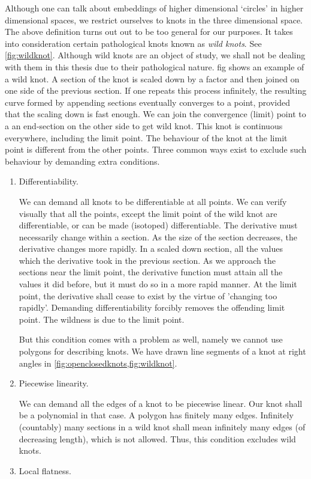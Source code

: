 Although one can talk about embeddings of higher dimensional `circles' in higher dimensional spaces, we restrict ourselves to knots in the three dimensional space. The above definition turns out out to be too general for our purposes. It takes into consideration certain pathological knots known as \textit{wild knots}. See \cref{fig:wildknot}. Although wild knots are an object of study, we shall not be dealing with them in this thesis due to their pathological nature. fig shows an example of a wild knot. A section of the knot is scaled down by a factor and then joined on one side of the previous section. If one repeats this process infinitely, the resulting curve formed by appending sections eventually converges to a point, provided that the scaling down is fast enough. We can join the convergence (limit) point to a an end-section on the other side to get wild knot. This knot is continuous everywhere, including the limit point. The behaviour of the knot at the limit point is different from the other points. Three common ways exist to exclude such behaviour by demanding extra conditions.
\begin{enumerate}
    \item Differentiability.

    We can demand all knots to be differentiable at all points. We can verify visually that all the points, except the limit point of the wild knot are differentiable, or can be made (isotoped) differentiable. The derivative must necessarily change within a section. As the size of the section decreases, the derivative changes more rapidly. In a scaled down section, all the values which the derivative took in the previous section. As we approach the sections near the limit point, the derivative function must attain all the values it did before, but it must do so in a more rapid manner. At the limit point, the derivative shall cease to exist by the virtue of 'changing too rapidly'. Demanding differentiability forcibly removes the offending limit point. The wildness is due to the limit point.

    But this condition comes with a problem as well, namely we cannot use polygons for describing knots. We have drawn line segments of a knot at right angles in \cref{fig:openclosedknots,fig:wildknot}.
    \item Piecewise linearity.

    We can demand all the edges of a knot to be piecewise linear. Our knot shall be a polynomial in that case. A polygon has finitely many edges. Infinitely (countably) many sections in a wild knot shall mean infinitely many edges (of decreasing length), which is not allowed. Thus, this condition excludes wild knots.
    \item Local flatness.
\end{enumerate}
